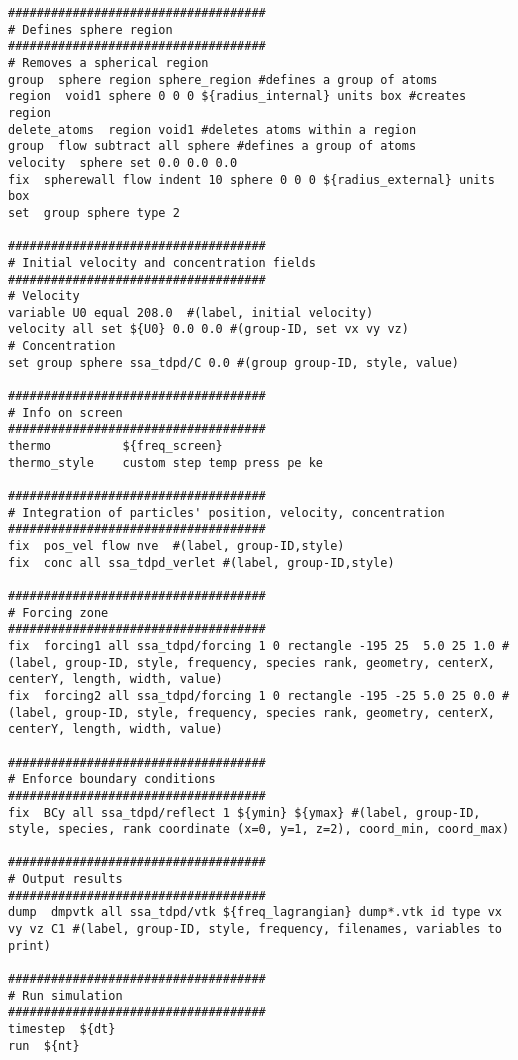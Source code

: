 \documentclass[a4paper,12pt,oneside]{report}
\begin{document}
\begin{lstlisting}
####################################
# Defines sphere region
####################################
# Removes a spherical region
group  sphere region sphere_region #defines a group of atoms
region  void1 sphere 0 0 0 ${radius_internal} units box #creates region
delete_atoms  region void1 #deletes atoms within a region
group  flow subtract all sphere #defines a group of atoms
velocity  sphere set 0.0 0.0 0.0 
fix  spherewall flow indent 10 sphere 0 0 0 ${radius_external} units box
set	 group sphere type 2

####################################
# Initial velocity and concentration fields
####################################
# Velocity
variable U0 equal 208.0  #(label, initial velocity)
velocity all set ${U0} 0.0 0.0 #(group-ID, set vx vy vz)
# Concentration
set	group sphere ssa_tdpd/C 0.0 #(group group-ID, style, value)

####################################
# Info on screen
####################################
thermo          ${freq_screen} 
thermo_style    custom step temp press pe ke

####################################
# Integration of particles' position, velocity, concentration
####################################
fix  pos_vel flow nve  #(label, group-ID,style)
fix  conc all ssa_tdpd_verlet #(label, group-ID,style)

####################################
# Forcing zone
####################################
fix  forcing1 all ssa_tdpd/forcing 1 0 rectangle -195 25  5.0 25 1.0 #(label, group-ID, style, frequency, species rank, geometry, centerX, centerY, length, width, value)
fix  forcing2 all ssa_tdpd/forcing 1 0 rectangle -195 -25 5.0 25 0.0 #(label, group-ID, style, frequency, species rank, geometry, centerX, centerY, length, width, value)

####################################
# Enforce boundary conditions
####################################
fix  BCy all ssa_tdpd/reflect 1 ${ymin} ${ymax} #(label, group-ID, style, species, rank coordinate (x=0, y=1, z=2), coord_min, coord_max)

####################################
# Output results
####################################
dump  dmpvtk all ssa_tdpd/vtk ${freq_lagrangian} dump*.vtk id type vx vy vz C1 #(label, group-ID, style, frequency, filenames, variables to print)

####################################
# Run simulation
####################################
timestep  ${dt}
run  ${nt}

\end{lstlisting}
 
 
 
\end{document}
